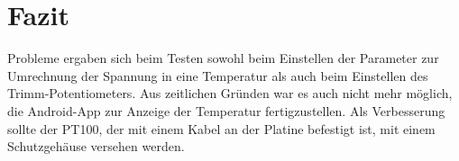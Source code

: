 \documentclass{article}
\begin{document}
\section{Fazit}
  Probleme ergaben sich beim Testen sowohl beim Einstellen der Parameter zur
  Umrechnung der Spannung in eine Temperatur als auch beim Einstellen des
  Trimm-Potentiometers. Aus zeitlichen Gründen war es auch nicht mehr möglich,
  die Android-App zur Anzeige der Temperatur fertigzustellen.
  Als Verbesserung sollte der PT100, der mit einem Kabel an der Platine befestigt
  ist, mit einem Schutzgehäuse versehen werden.





\end{document}
